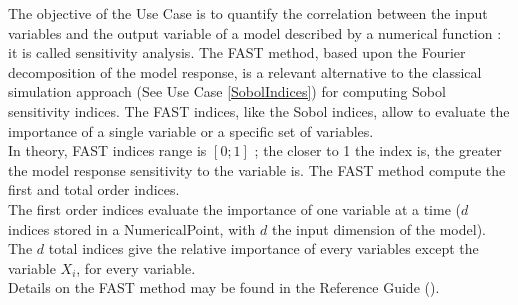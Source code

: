 \renewcommand{\filename}{docUC_CentralUncertainty_FASTIndices.tex}
\renewcommand{\filetitle}{UC : Sensitivity analysis : FAST indices}

\HeaderIIILevel



The objective of the Use Case is to quantify the correlation between the input variables and the output variable of a model described by a numerical function : it is called sensitivity analysis. The FAST method, based upon the Fourier decomposition of the model response, is a relevant alternative to the classical simulation approach (See Use Case \ref{SobolIndices}) for computing Sobol sensitivity indices. The FAST indices, like the Sobol indices, allow to evaluate the importance of a single variable or a specific set of variables.\\
In theory, FAST indices range is $\left[0; 1\right]$ ; the closer to 1 the index is, the greater the model response sensitivity to the variable is. The FAST method compute the first and total order indices.\\
The first order indices evaluate the importance of one variable at a time ($d$ indices stored in a NumericalPoint, with $d$ the input dimension of the model).\\
The $d$ total indices give the relative importance of every variables except the variable $X_i$, for every variable.\\

Details on the FAST method may be found in the Reference Guide ().\\

